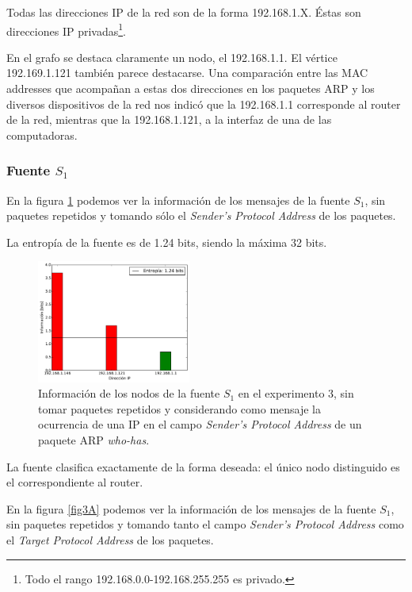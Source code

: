 \par Todas las direcciones IP de la red son de la forma 192.168.1.X.
Éstas son direcciones IP privadas\footnote{Todo el rango 192.168.0.0-192.168.255.255 es privado.}.

\par En el grafo se destaca claramente un nodo, el 192.168.1.1.
El vértice 192.169.1.121 también parece destacarse.
Una comparación entre las MAC addresses que acompañan a estas dos direcciones en los paquetes ARP y los diversos dispositivos de la red nos indicó que la 192.168.1.1 corresponde al router de la red, mientras que la 192.168.1.121, a la interfaz de una de las computadoras.

\subsubsection{Fuente $S_1$}

\par En la figura \ref{fig3SinRSinA} podemos ver la información de los mensajes de la fuente $S_1$, sin paquetes repetidos y tomando sólo el \textit{Sender's Protocol Address} de los paquetes.

\par La entropía de la fuente es de 1.24 bits, siendo la máxima 32 bits. 

\begin{figure}
    \centering
    \includegraphics[width=0.45\textwidth]{figuras/casa_figura.pdf}
    \caption{Información de los nodos de la fuente $S_1$ en el experimento 3, sin tomar paquetes repetidos y considerando como mensaje la ocurrencia de una IP en el campo \textit{Sender's Protocol Address} de un paquete ARP \textit{who-has}.}
    \label{fig3SinRSinA}
\end{figure}

\par La fuente clasifica exactamente de la forma deseada: el único nodo distinguido es el correspondiente al router.

\par En la figura \ref{fig3A} podemos ver la información de los mensajes de la fuente $S_1$, sin paquetes repetidos y tomando tanto el campo \textit{Sender's Protocol Address} como el \textit{Target Protocol Address} de los paquetes.


